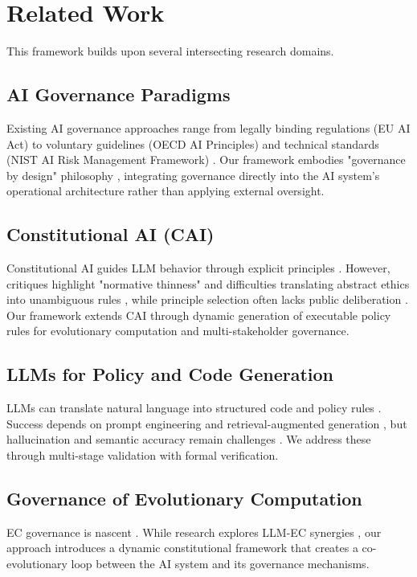 \documentclass[sigconf,natbib]{acmart}
\begin{document}
\section{Related Work}
\label{sec:related_work}
This framework builds upon several intersecting research domains.

\subsection{AI Governance Paradigms}
Existing AI governance approaches range from legally binding regulations (EU AI Act) to voluntary guidelines (OECD AI Principles) and technical standards (NIST AI Risk Management Framework) \cite{Wynants2025ETHICAL, WorldBank2024AIGovernance, CambridgeUP2024CorporateGovernance}. Our framework embodies "governance by design" philosophy \cite{Engin2025AdaptiveAIGovernance}, integrating governance directly into the AI system's operational architecture rather than applying external oversight.

\subsection{Constitutional AI (CAI)}
Constitutional AI guides LLM behavior through explicit principles \cite{Bai2025ConstitutionalAI}. However, critiques highlight "normative thinness" and difficulties translating abstract ethics into unambiguous rules \cite{DigiCon2025ConstitutionalAIThin, ChaconMenke2025CAISmallLLMs}, while principle selection often lacks public deliberation \cite{Hwang2025PublicCAI}. Our framework extends CAI through dynamic generation of executable policy rules for evolutionary computation and multi-stakeholder governance.

\subsection{LLMs for Policy and Code Generation}
LLMs can translate natural language into structured code and policy rules \cite{Almulla2024EmergenceLLMPolicy, ResearchGate2025AutoPAC, Li2025VeriCoder}. Success depends on prompt engineering and retrieval-augmented generation \cite{AnalyticsVidhya2024PromptingTechniques, arXiv2025FutureWorkRAG}, but hallucination and semantic accuracy remain challenges \cite{AAAI2025CodeHalu, Taeihagh2025Governing}. We address these through multi-stage validation with formal verification.

\subsection{Governance of Evolutionary Computation}
EC governance is nascent \cite{Chauhan2025ECLLMSurvey}. While research explores LLM-EC synergies \cite{Nordin2024LLMGP}, our approach introduces a dynamic constitutional framework that creates a co-evolutionary loop between the AI system and its governance mechanisms.
\end{document}
